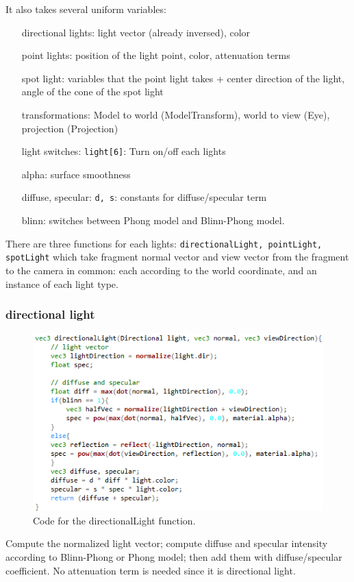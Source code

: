 \documentclass[11pt]{article}
\begin{document}
It also takes several uniform variables:
\begin{itemize}
	\item [directional lights:] light vector (already inversed), color
	\item [point lights:] position of the light point, color, attenuation terms
	\item [spot light:] variables that the point light takes + center direction of the light, angle of the cone of the spot light
	\item [transformations:] Model to world (ModelTransform), world to view (Eye), projection (Projection)
	\item [light switches:] \texttt{light[6]}: Turn on/off each lights
	\item [alpha:] surface smoothness
	\item [diffuse, specular:] \texttt{d, s}: constants for diffuse/specular term
	\item [blinn:] switches between Phong model and Blinn-Phong model.
\end{itemize}
There are three functions for each lights: \texttt{directionalLight, pointLight, spotLight} which take fragment normal vector and view vector from the fragment to the camera in common: each according to the world coordinate, and an instance of each light type.
\subsubsection{directional light} \label{sssec:1.2.1}
\begin{figure}[htb]
	\begin{center}
		\includegraphics[width=0.7\linewidth]{directional.png}
	\end{center}
	\caption{Code for the directionalLight function.}
\end{figure}
Compute the normalized light vector; compute diffuse and specular intensity according to Blinn-Phong or Phong model; then add them with diffuse/specular coefficient. No attenuation term is needed since it is directional light.
\newpage
\end{document}
